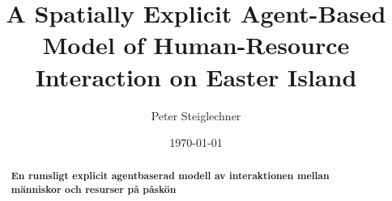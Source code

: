 \documentclass{kththesis}
\title{A Spatially Explicit Agent-Based Model of Human-Resource Interaction on Easter Island}
\author{Peter Steiglechner}
\date{\today}
\begin{document}
\frontmatter
%
\titlepage

\begin{abstract}
	
\end{abstract}
\newpage
\begin{otherlanguage}{swedish}
	
	\begin{abstract}
	\textbf{En rumsligt explicit agentbaserad modell av interaktionen mellan människor och resurser på påskön}
	\vspace{12pt}	
	
	\end{abstract}
\end{otherlanguage}

\tableofcontents

\mainmatter
%












\printbibliography[heading=bibintoc]

\appendix
{}

\tailmatter
\end{document}
